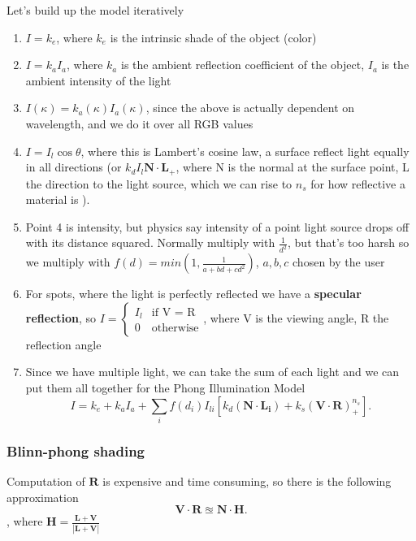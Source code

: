 \documentclass[11pt]{article}
\begin{document}
Let's build up the model iteratively

\begin{enumerate}
    \item $I = k_e$, where $k_e$ is the intrinsic shade of the object (color)  
    \item $I = k_a I_a$, where $k_a$ is the ambient reflection coefficient of the object, $I_a$ is the ambient intensity of the light   
    \item $I(\kappa) = k_a(\kappa) I_a(\kappa)$, since the above is actually dependent on wavelength, and we do it over all RGB values
    \item $I = I_l \cos \theta$, where this is Lambert's cosine law, a surface reflect light equally in all directions (or $k_dI_l\mathbf{N\cdot L}_+$, where N is the normal at the surface point, L the direction to the light source, which we can rise to $n_s$ for how reflective a material is ). 
    \item Point 4 is intensity, but physics say intensity of a point light source drops off with its distance squared. Normally multiply with $\frac{1}{d^2}$, but that's too harsh so we multiply with $f(d) = min(1, \frac{1}{a+bd+cd^2})$, $a,b,c$ chosen by the user
    \item For spots, where the light is perfectly reflected we have a \textbf{specular reflection}, so $I = \begin{cases}
        I_l & \text{if V = R}\\
        0 & \text{otherwise}
    \end{cases}$, where V is the viewing angle, R the reflection angle
    \item Since we have multiple light, we can take the sum of each light and we can put them all together for the Phong Illumination Model \[
    I = k_e + k_aI_a + \sum_{i} f(d_i) I_{li} [k_d(\mathbf{N\cdot L_i}) + k_s(\mathbf{V\cdot R})_+^{n_s}] 
    .\] 
\end{enumerate}

\subsubsection*{Blinn-phong shading}
Computation of $\mathbf{R}$ is expensive and time consuming, so there is the following approximation
\[
\mathbf{V\cdot R \approxeq N \cdot H}
.\], where $\mathbf{H = \frac{L+V}{|L+V|}}$ 


\end{document}
